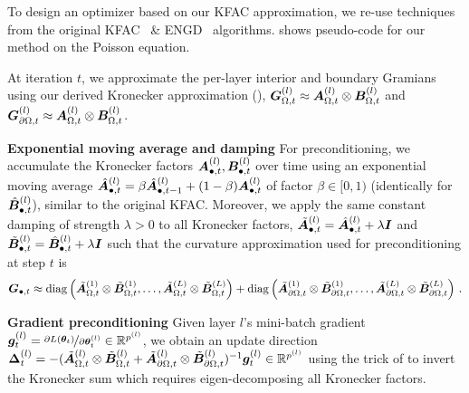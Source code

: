 To design an optimizer based on our KFAC approximation, we re-use techniques from the original KFAC~\cite{martens2015optimizing} \& ENGD~\cite{muller2023achieving} algorithms.
 shows pseudo-code for our method on the Poisson equation.

At iteration $t$, we approximate the per-layer interior and boundary Gramians using our derived Kronecker approximation (),
${\bm{G}}_{\Omega,t}^{(l)} \approx {\bm{A}}_{\Omega,t}^{(l)}\otimes {\bm{B}}_{\Omega,t}^{(l)}$ and ${\bm{G}}_{\partial \Omega, t}^{(l)}\approx {\bm{A}}_{\Omega,t}^{(l)}\otimes {\bm{B}}_{\Omega,t}^{(l)}$.

\textbf{Exponential moving average and damping}
For preconditioning, we accumulate the Kronecker factors ${\bm{A}}^{(l)}_{\bullet,t}, {\bm{B}}^{(l)}_{\bullet,t}$ over time using an exponential moving average $\hat{{\bm{A}}}^{(l)}_{\bullet,t} = \beta \hat{{\bm{A}}}^{(l)}_{\bullet,t-1} + (1 - \beta) {\bm{A}}^{(l)}_{\bullet,t}$ of factor $\beta\in[0,1)$ (identically for $\hat{{\bm{B}}}^{(l)}_{\bullet, t}$), similar to the original KFAC.
Moreover, we apply the same constant damping of strength $\lambda>0$ to all Kronecker factors, $\tilde{{\bm{A}}}^{(l)}_{\bullet,t} = \hat{{\bm{A}}}^{(l)}_{\bullet,t} + \lambda {\bm{I}}$ and $\tilde{{\bm{B}}}^{(l)}_{\bullet,t} = \hat{{\bm{B}}}^{(l)}_{\bullet,t} + \lambda {\bm{I}}$ such that the curvature approximation used for preconditioning at step $t$ is
\begin{align*}
  {\bm{G}}_{\bullet, t}
  \approx
    \operatorname{diag}
    \left(
    \tilde{{\bm{A}}}^{(1)}_{\Omega,t} \otimes \tilde{{\bm{B}}}_{\Omega,t}^{(1)},
    \dots,
    \tilde{{\bm{A}}}^{(L)}_{\Omega,t} \otimes \tilde{{\bm{B}}}_{\Omega,t}^{(L)}
    \right)
  +
    \operatorname{diag}
    \left(
    \tilde{{\bm{A}}}^{(1)}_{\partial\Omega,t} \otimes \tilde{{\bm{B}}}_{\partial\Omega,t}^{(1)},
    \dots,
    \tilde{{\bm{A}}}^{(L)}_{\partial\Omega,t} \otimes \tilde{{\bm{B}}}_{\partial\Omega,t}^{(L)}
    \right)\,.
\end{align*}

\textbf{Gradient preconditioning}
Given layer $l$'s mini-batch gradient ${\bm{g}}_t^{(l)} = \nicefrac{\partial L({\bm{\theta}}_t)}{\partial{\bm{\theta}}^{(l)}_t} \in {\mathbb{R}}^{p^{(l)}}$, we obtain an update direction ${\bm{\Delta}}_t^{(l)} = -(\tilde{{\bm{A}}}^{(l)}_{\Omega,t} \otimes \tilde{{\bm{B}}}^{(l)}_{\Omega,t} + \tilde{{\bm{A}}}^{(l)}_{\partial\Omega,t} \otimes \tilde{{\bm{B}}}^{(l)}_{\partial\Omega,t})^{-1} {\bm{g}}_t^{(l)} \in {\mathbb{R}}^{p^{(l)}}$ using the trick of \cite[Appendix I]{martens2015optimizing} to invert the Kronecker sum which requires eigen-decomposing all Kronecker factors.

